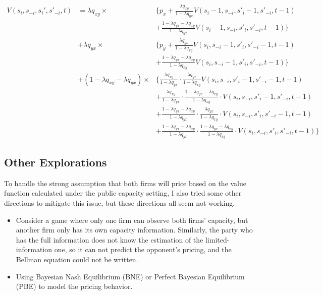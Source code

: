 \documentclass[12pt,letterpaper]{article}
\begin{document}
\begin{align*}
    V(s_i,s_{-i},s_{i}',s'_{-i},t) &= \lambda q_{xy} \times & \{p_x + \frac{\lambda q_{xy}}{1-\lambda q_{yx}} V(s_i-1,s_{-i},s'_i-1,s'_{-i},t-1) \\
    && + \frac{1-\lambda q_{yx}-\lambda q_{xy}}{1-\lambda q_{yx}} V(s_i-1,s_{-i},s'_i,s'_{-i},t-1) \} \\
    & + \lambda q_{yx} \times & \{p_y + \frac{\lambda q_{yx}}{1-\lambda q_{xy}} V(s_i,s_{-i}-1,s'_i,s'_{-i}-1,t-1) \\
    && + \frac{1-\lambda q_{yx}-\lambda q_{xy}}{1-\lambda q_{xy}} V(s_i,s_{-i}-1,s'_i,s'_{-i},t-1) \} \\
    & + (1-\lambda q_{xy} - \lambda q_{yx}) \times & \{ \frac{\lambda q_{xy}}{1-\lambda q_{yx}} \cdot \frac{\lambda q_{yx}}{1-\lambda q_{xy}} V(s_i,s_{-i},s'_i-1,s'_{-i}-1,t-1)  \\
    && +\frac{\lambda q_{xy}}{1-\lambda q_{yx}} \cdot \frac{1-\lambda q_{yx}-\lambda q_{xy}}{1-\lambda q_{xy}} \cdot V(s_i,s_{-i},s'_i-1,s'_{-i},t-1) \\
    && + \frac{1-\lambda q_{yx}-\lambda q_{xy}}{1-\lambda q_{yx}} \cdot \frac{\lambda q_{yx}}{1-\lambda q_{xy}} \cdot V(s_i,s_{-i},s'_i,s'_{-i}-1,t-1) \\
    && + \frac{1-\lambda q_{yx}-\lambda q_{xy}}{1-\lambda q_{yx}} \cdot \frac{1-\lambda q_{yx}-\lambda q_{xy}}{1-\lambda q_{xy}} \cdot V(s_i,s_{-i},s'_i,s'_{-i},t-1) \}
\end{align*}

\subsection{Other Explorations}

To handle the strong assumption that both firms will price based on the value function calculated under the public capacity setting, I also tried some other directions to mitigate this issue, but these directions all seem not working.

\begin{itemize}
    \item Consider a game where only one firm can observe both firms' capacity, but another firm only has its own capacity information. Similarly, the party who has the full information does not know the estimation of the limited-information one, so it can not predict the opponent's pricing, and the Bellman equation could not be written.
    \item Using Bayesian Nash Equilibrium (BNE) or Perfect Bayesian Equilibrium (PBE) to model the pricing behavior.
\end{itemize}
\end{document}
